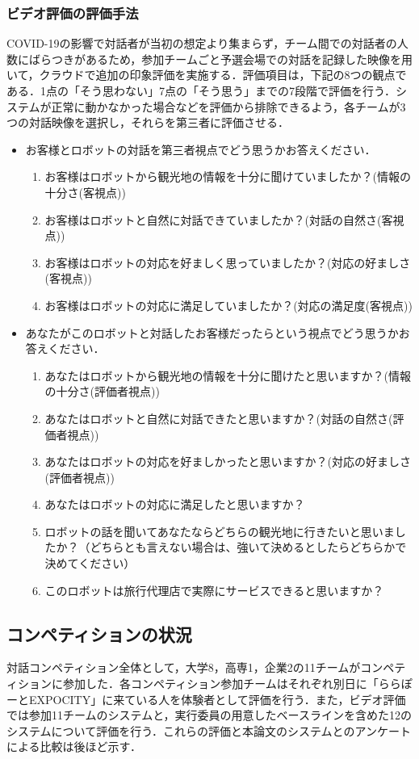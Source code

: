 \subsubsection{ビデオ評価の評価手法}
COVID-19の影響で対話者が当初の想定より集まらず，チーム間での対話者の人数にばらつきがあるため，参加チームごと予選会場での対話を記録した映像を用いて，クラウドで追加の印象評価を実施する．評価項目は，下記の8つの観点である．1点の「そう思わない」7点の「そう思う」までの7段階で評価を行う．システムが正常に動かなかった場合などを評価から排除できるよう，各チームが3つの対話映像を選択し，それらを第三者に評価させる．
\begin{itemize}
    \item お客様とロボットの対話を第三者視点でどう思うかお答えください．
    \begin{enumerate}
        \item お客様はロボットから観光地の情報を十分に聞けていましたか？(情報の十分さ(客視点))
        \item お客様はロボットと自然に対話できていましたか？(対話の自然さ(客視点))
        \item お客様はロボットの対応を好ましく思っていましたか？(対応の好ましさ(客視点))
        \item お客様はロボットの対応に満足していましたか？(対応の満足度(客視点))
    \end{enumerate}
    \item あなたがこのロボットと対話したお客様だったらという視点でどう思うかお答えください．
    \begin{enumerate}
        \item あなたはロボットから観光地の情報を十分に聞けたと思いますか？(情報の十分さ(評価者視点))
        \item あなたはロボットと自然に対話できたと思いますか？(対話の自然さ(評価者視点))
        \item あなたはロボットの対応を好ましかったと思いますか？(対応の好ましさ(評価者視点))
        \item あなたはロボットの対応に満足したと思いますか？
        \item ロボットの話を聞いてあなたならどちらの観光地に行きたいと思いましたか？（どちらとも言えない場合は、強いて決めるとしたらどちらかで決めてください）
        \item このロボットは旅行代理店で実際にサービスできると思いますか？
    \end{enumerate}
\end{itemize}

\subsection{コンペティションの状況}
対話コンペティション全体として，大学8，高専1，企業2の11チームがコンペティションに参加した．各コンペティション参加チームはそれぞれ別日に「ららぽーとEXPOCITY」に来ている人を体験者として評価を行う．また，ビデオ評価では参加11チームのシステムと，実行委員の用意したベースラインを含めた12のシステムについて評価を行う．これらの評価と本論文のシステムとのアンケートによる比較は後ほど示す．

